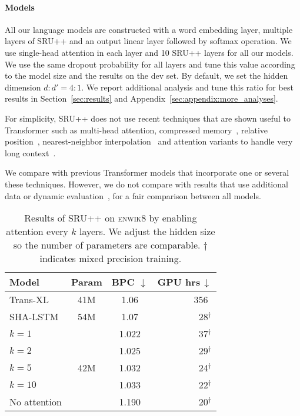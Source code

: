 \paragraph{Models}
All our language models are constructed with a word embedding layer, multiple layers of SRU++ and an output linear layer followed by softmax operation. 
We use single-head attention in each layer and 10 SRU++ layers for all our models.
We use the same dropout probability for all layers and tune this value according to the model size and the results on the dev set.
By default, we set the hidden dimension $d : d' = 4 : 1$.
We report additional analysis and tune this ratio for best results in Section~\ref{sec:results} and Appendix~\ref{sec:appendix:more_analyses}.


For simplicity, SRU++ does not use recent techniques that are shown useful to Transformer such as multi-head attention, compressed memory~\cite{Rae2020Compressive}, relative position~\cite{shaw-etal-2018-self,press2020shortformer}, nearest-neighbor interpolation~\cite{Khandelwal2020Generalization} and attention variants to handle very long context~\cite{sukhbaatar-etal-2019-adaptive,roy2020efficient}.

We compare with previous Transformer models that incorporate one or several these techniques.
However, we do not compare with results that use additional data or dynamic evaluation~\cite{Graves13,pmlr-v80-krause18a},
for a fair comparison between all models.


\begin{table}[!t]
    \centering
    \begin{tabular}{lccr}
    \toprule
    \bf Model & \bf Param & \bf BPC $\downarrow$ & \bf GPU hrs$\,\downarrow$\\
    \hline
    Trans-XL & 41M & 1.06 & 356$\ \,$\\
    SHA-LSTM & 54M & 1.07 & 28$^\dagger$\\
    \hline
    $k=1$ & \multirow{5}{*}{42M} & 1.022 & 37$^\dagger$\\
    $k=2$ & & 1.025 & 29$^\dagger$\\
    $k=5$ & & 1.032 & 24$^\dagger$\\
    $k=10$ & & 1.033 & 22$^\dagger$\\
    No attention & & 1.190 & 20$^\dagger$\\
    \bottomrule
    \end{tabular}
    \caption{Results of SRU++ on \textsc{enwik8} by enabling attention every $k$ layers. We adjust the hidden size so the number of parameters are comparable. $\dagger$ indicates mixed precision training.}
    \label{table:analyze_attention}
\end{table}

